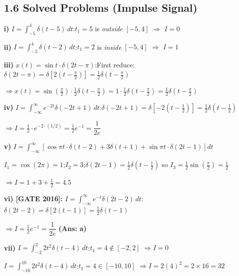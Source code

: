 \documentclass[10pt,a4paper]{article}
\begin{document}
\subsection*{1.6 Solved Problems (Impulse Signal)}

\begin{exbox}
\textbf{i)} $I=\displaystyle\int_{-5}^{4}\delta(t-5)\,dt$:\quad $t_1=5$ is \emph{outside} $[-5,4]$ $\Rightarrow$ $\boxed{I=0}$

\medskip
\textbf{ii)} $I=\displaystyle\int_{-5}^{4}\delta(t-2)\,dt$:\quad $t_1=2$ is \emph{inside} $[-5,4]$ $\Rightarrow$ $\boxed{I=1}$

\medskip
\textbf{iii)} $x(t)=\sin t\cdot\delta(2t-\pi)$:\quad First reduce: $\delta(2t-\pi)=\delta[2(t-\frac{\pi}{2})]=\frac{1}{2}\delta(t-\frac{\pi}{2})$

\hspace{1em}$\Rightarrow x(t)=\sin\!\left(\tfrac{\pi}{2}\right)\cdot\tfrac{1}{2}\delta(t-\tfrac{\pi}{2})=1\cdot\tfrac{1}{2}\delta(t-\tfrac{\pi}{2})=\boxed{\tfrac{1}{2}\delta(t-\tfrac{\pi}{2})}$

\medskip
\textbf{iv)} $I=\displaystyle\int_{-\infty}^{\infty}e^{-2t}\delta(-2t+1)\,dt$:\quad $\delta(-2t+1)=\delta[-2(t-\tfrac{1}{2})]=\tfrac{1}{2}\delta(t-\tfrac{1}{2})$

\hspace{1em}$\Rightarrow I=\tfrac{1}{2}\cdot e^{-2\cdot(1/2)}=\tfrac{1}{2}e^{-1}=\boxed{\dfrac{1}{2e}}$

\medskip
\textbf{v)} $I=\displaystyle\int_{-\infty}^{\infty}\left[\cos\pi t\cdot\delta(t-2)+3\delta(t+1)+\sin\pi t\cdot\delta(2t-1)\right]dt$

\hspace{1em}$I_1=\cos(2\pi)=1$;\quad $I_2=3$;\quad $\delta(2t-1)=\tfrac{1}{2}\delta(t-\tfrac{1}{2})$ so $I_3=\tfrac{1}{2}\sin\!\left(\tfrac{\pi}{2}\right)=\tfrac{1}{2}$

\hspace{1em}$\Rightarrow \boxed{I = 1+3+\tfrac{1}{2}=4.5}$

\medskip
\textbf{vi) [GATE 2016]:} $I=\displaystyle\int_{-\infty}^{\infty}e^{-t}\delta(2t-2)\,dt$:\quad $\delta(2t-2)=\delta[2(t-1)]=\tfrac{1}{2}\delta(t-1)$

\hspace{1em}$\Rightarrow I=\tfrac{1}{2}e^{-1}=\boxed{\dfrac{1}{2e}}$ \quad\textbf{(Ans: a)}

\medskip
\textbf{vii)} $I=\displaystyle\int_{-2}^{2}2t^2\delta(t-4)\,dt$:\quad $t_1=4\notin[-2,2]$ $\Rightarrow I=0$

\hspace{1em}$I=\displaystyle\int_{-10}^{10}2t^2\delta(t-4)\,dt$:\quad $t_1=4\in[-10,10]$ $\Rightarrow I=2(4)^2=2\times16=\boxed{32}$
\end{exbox}
\end{document}
